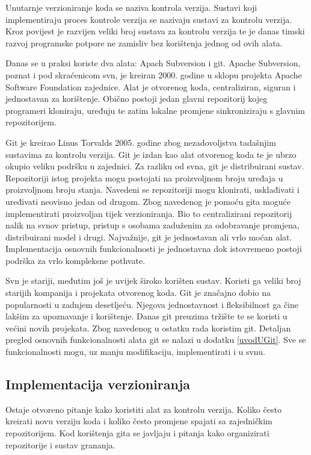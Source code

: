\documentclass[times, utf8, diplomski, numeric]{fer}
\begin{document}
Unutarnje verzioniranje koda se naziva kontrola verzija\citep{wiki:VersionControl}. Sustavi koji implementiraju proces kontrole verzija se nazivaju sustavi za kontrolu verzija. Kroz povijest je razvijen veliki broj sustava za kontrolu verzija te je danas timski razvoj programske potpore ne zamisliv bez korištenja jednog od ovih alata.

Danas se u praksi koriste dva alata: Apach Subversion i git. Apache Subversion, poznat i pod skraćenicom svn, je kreiran 2000. godine u sklopu projekta Apache Software Foundation zajednice. Alat je otvorenog koda, centraliziran, siguran i jednostavan za korištenje. Obično postoji jedan glavni repozitorij kojeg programeri kloniraju, uređuju te zatim lokalne promjene sinkroniziraju s glavnim repozitorijem.

Git je kreirao Linus Torvalds 2005. godine zbog nezadovoljstva tadašnjim sustavima za kontrolu verzija. Git je izdan kao alat otvorenog koda te je ubrzo okupio veliku podršku u zajednici. Za razliku od svna, git je distribuirani sustav. Repozitoriji istog projekta mogu postojati na proizvoljnom broju uređaja u proizvoljnom broju stanja. Navedeni se repozitoriji mogu klonirati, usklađivati i uređivati neovisno jedan od drugom. Zbog navedenog je pomoću gita moguće implementirati proizvoljan tijek verzioniranja. Bio to centralizirani repozitorij nalik na svnov pristup, pristup s osobama zaduženim za odobravanje promjena, distribuirani model i drugi. Najvažnije, git je jednostavan ali vrlo moćan alat. Implementacija osnovnih funkcionalnosti je jednostavna dok istovremeno postoji podrška za vrlo kompleksne pothvate.

Svn je stariji, međutim još je uvijek široko korišten sustav. Koristi ga veliki broj starijih kompanija i projekata otvorenog koda. Git je značajno dobio na popularnosti u zadnjem desetljeću. Njegova jednostavnost i fleksibilnost ga čine lakšim za upoznavanje i korištenje. Danas git preuzima tržište te se koristi u većini novih projekata. Zbog navedenog u ostatku rada koristim git. Detaljan pregled osnovnih funkcionalnosti alata git se nalazi u dodatku \ref{uvodUGit}. Sve se funkcionalnosti mogu, uz manju modifikaciju, implementirati i u svnu.

\subsection{Implementacija verzioniranja}

Ostaje otvoreno pitanje kako koristiti alat za kontrolu verzija. Koliko često kreirati novu verziju koda i koliko često promjene spajati sa zajedničkim repozitorijem. Kod korištenja gita se javljaju i pitanja kako organizirati repozitorije i sustav grananja.
\end{document}
